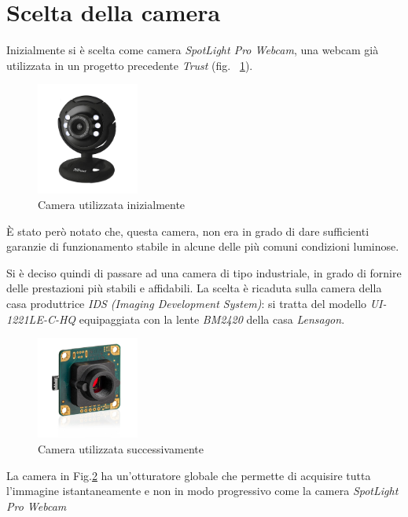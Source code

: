 \section{Scelta della camera}
Inizialmente si è scelta come camera \textit{SpotLight Pro Webcam}, una webcam già utilizzata in un progetto precedente \textit{Trust} (fig. ~\ref{fig:TrustCam}).
\begin{figure}[H]
	\centering
	\includegraphics[width=0.3\textwidth]{Immagini/TrustCam.jpg}
	\caption{Camera utilizzata inizialmente}
	\label{fig:TrustCam}
\end{figure}
È stato però notato che, questa camera, non era in grado di dare sufficienti garanzie di funzionamento stabile in alcune delle più comuni condizioni luminose.

Si è deciso quindi di passare ad una camera di tipo industriale, in grado di fornire delle prestazioni più stabili e affidabili. 
La scelta è ricaduta sulla camera della casa produttrice \textit{IDS (Imaging Development System)}: si tratta del modello \textit{UI-1221LE-C-HQ} equipaggiata con la lente \textit{BM2420} della casa \textit{Lensagon}.
\begin{figure}[H]
	\centering
	\includegraphics[width=0.3\textwidth]{Immagini/camera-usb2-ueye-le-rev2-boardlevel-m12-1.jpg}
	\caption{Camera utilizzata successivamente}
	\label{fig:Cam}
\end{figure}

La camera in Fig.\ref{fig:Cam} ha un'otturatore globale che permette di acquisire tutta l'immagine istantaneamente e non in modo progressivo come la camera  \textit{SpotLight Pro Webcam}



